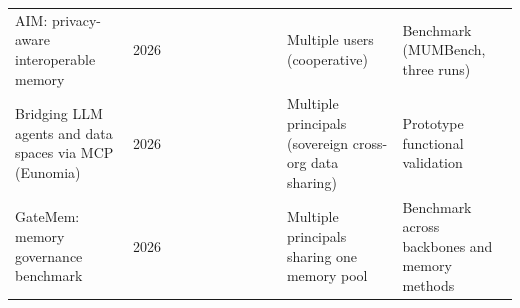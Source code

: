 \documentclass[conference]{IEEEtran}
\newcommand{\half}{{\small\LEFTcircle}}
\newcommand{\none}{{\small\Circle}}
\begin{document}
{\begin{longtable}{>{\raggedright\arraybackslash}p{4.2cm} c cccccccc >{\raggedright\arraybackslash}p{3.6cm} >{\raggedright\arraybackslash}p{4.4cm}}
AIM: privacy-aware interoperable memory \cite{johnson2026aim} & 2026 & \none{} & \none{} & \none{} & \half{} & \none{} & \none{} & \none{} & \none{} & Multiple users (cooperative) & Benchmark (MUMBench, three runs) \\
Bridging LLM agents and data spaces via MCP (Eunomia) \cite{alonsoruiz2026bridging} & 2026 & \half{} & \half{} & \none{} & \none{} & \none{} & \none{} & \none{} & \none{} & Multiple principals (sovereign cross-org data sharing) & Prototype functional validation \\
GateMem: memory governance benchmark \cite{ren2026gatemem} & 2026 & \none{} & \none{} & \none{} & \half{} & \none{} & \none{} & \none{} & \half{} & Multiple principals sharing one memory pool & Benchmark across backbones and memory methods \\
\end{longtable}
}
\end{document}
